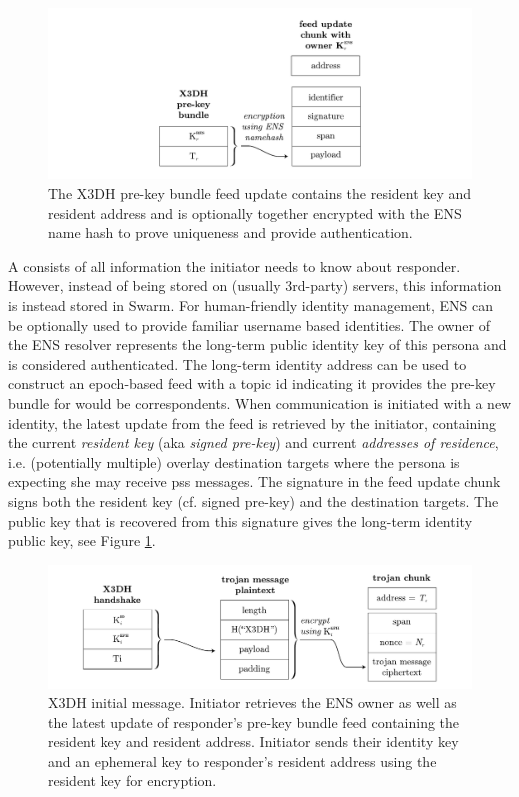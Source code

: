 \begin{figure}[htbp]
   \centering
   \includegraphics[width=\textwidth]{fig/prekey-bundle-feed-update.pdf}
   \caption[X3DH pre-key bundle feed update \statusgreen]{The X3DH pre-key bundle feed update contains the resident key and resident address and is optionally together encrypted with the ENS name hash to prove uniqueness and provide authentication.}
\label{fig:prekey-bundle-feed-update}
\end{figure}


A  consists of all information the initiator needs to know about responder. However, instead of being stored on (usually 3rd-party) servers, this information is instead stored in Swarm. For human-friendly identity management, ENS can be optionally used to provide familiar username based identities. The owner of the ENS resolver represents the long-term public identity key of this persona and is considered authenticated. The long-term identity address can be used to construct an epoch-based feed with a topic id indicating it provides the pre-key bundle for would be correspondents. When communication is initiated with a new identity, the latest update from the feed is retrieved by the initiator, containing the current \emph{resident key} (aka \emph{signed pre-key}) and current \emph{addresses of residence}, i.e. (potentially multiple) overlay destination targets where the persona is expecting she may receive pss messages. The signature in the feed update chunk signs both the resident key (cf. signed pre-key) and the destination targets. The public key that is recovered from this signature gives the long-term identity public key, see Figure \ref{fig:prekey-bundle-feed-update}.


\begin{figure}[htbp]
   \centering
   \includegraphics[width=.8\textwidth]{fig/x3dh-initial-message.pdf}
   \caption[X3DH initial message \statusgreen]{X3DH initial message. Initiator retrieves the ENS owner as well as the latest update of responder's pre-key bundle feed containing the resident key and resident address. Initiator sends their identity key and an ephemeral key to responder's resident address using the resident key for encryption. }
\label{fig:x3dh-initial-message}
\end{figure}


